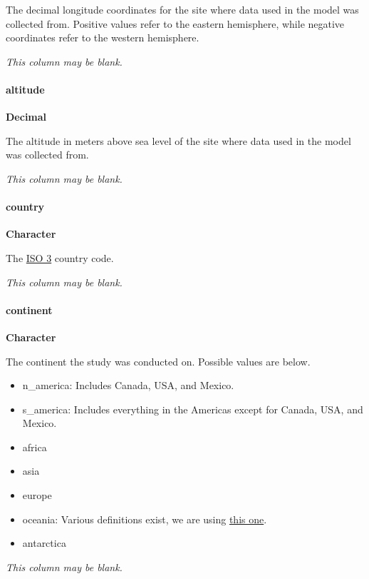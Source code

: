 \documentclass[]{article}
\let\oldparagraph\paragraph
\renewcommand{\paragraph}[1]{\oldparagraph{#1}\mbox{}}
\begin{document}
The decimal longitude coordinates for the site where data used in the
model was collected from. Positive values refer to the eastern
hemisphere, while negative coordinates refer to the western hemisphere.

\emph{This column may be blank.}

\paragraph{altitude}\label{altitude}

\textbf{Decimal}

The altitude in meters above sea level of the site where data used in
the model was collected from.

\emph{This column may be blank.}

\paragraph{country}\label{country}

\textbf{Character}

The
\href{https://unstats.un.org/unsd/tradekb/knowledgebase/country-code}{ISO
3} country code.

\emph{This column may be blank.}

\paragraph{continent}\label{continent}

\textbf{Character}

The continent the study was conducted on. Possible values are below.

\begin{itemize}
\item
  n\_america: Includes Canada, USA, and Mexico.
\item
  s\_america: Includes everything in the Americas except for Canada,
  USA, and Mexico.
\item
  africa
\item
  asia
\item
  europe
\item
  oceania: Various definitions exist, we are using
  \href{https://en.wikipedia.org/wiki/List_of_Oceanian_countries_by_population}{this
  one}.
\item
  antarctica
\end{itemize}

\emph{This column may be blank.}
\end{document}
